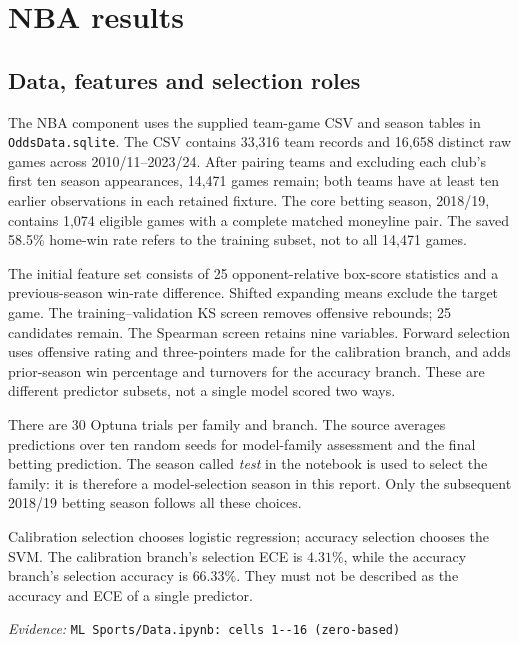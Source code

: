 \documentclass[11pt,letterpaper]{article}
\newcommand{\resulttable}[3]{\begin{table}[htbp]\centering\small\caption{#1}\label{#2}\end{table}}
\newcommand{\sourcefile}[1]{{\small\color{muted}\textit{Evidence:} \nolinkurl{#1}\par}}
\begin{document}


\clearpage
\section{NBA results}
\label{sec:nba}
\subsection{Data, features and selection roles}
The NBA component uses the supplied team-game CSV and season tables in
\texttt{OddsData.sqlite}. The CSV contains 33,316 team records and 16,658
distinct raw games across 2010/11--2023/24. After pairing teams and excluding
each club's first ten season appearances, 14,471 games remain; both teams
have at least ten earlier observations in each retained fixture.
The core betting season, 2018/19, contains 1,074 eligible games
with a complete matched moneyline pair. The saved 58.5\% home-win rate refers
to the training subset, not to all 14,471 games.

The initial feature set consists of 25 opponent-relative box-score statistics
and a previous-season win-rate difference. Shifted expanding means exclude the
target game. The training--validation KS screen removes offensive rebounds;
25 candidates remain. The Spearman screen retains nine variables. Forward
selection uses offensive rating and three-pointers made for the calibration
branch, and adds prior-season win percentage and turnovers for the accuracy
branch. These are different predictor subsets, not a single model scored two ways.

\resulttable{NBA chronology and sample sizes in the supplied core experiment.}
{tab:nba_splits}{nba_splits.tex}
There are 30 Optuna trials per family and branch. The source averages
predictions over ten random seeds for model-family assessment and the final
betting prediction. The season called \emph{test} in the notebook is used to
select the family: it is therefore a model-selection season in this report.
Only the subsequent 2018/19 betting season follows all these choices.

\resulttable{NBA model-family selection, 2017/18. The two columns describe
different branch-specific fitted variants; they are not joint scores of one model.}
{tab:nba_selection}{nba_selection.tex}
Calibration selection chooses logistic regression; accuracy selection chooses
the SVM. The calibration branch's selection ECE is $4.31\%$, while the
accuracy branch's selection accuracy is $66.33\%$. They must not be described
as the accuracy and ECE of a single predictor.
\sourcefile{ML Sports/Data.ipynb: cells 1--16 (zero-based)}
\end{document}
